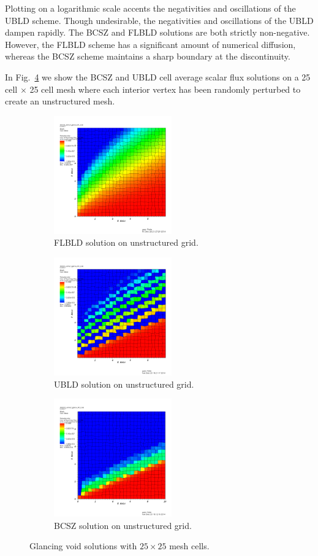 \documentclass{mc2015}
\newcommand{\fig}[1]{Fig.~\ref{#1}}                      %
\begin{document}
Plotting on a logarithmic scale accents the negativities and oscillations of the UBLD scheme.
Though undesirable, the negativities and oscillations of the UBLD dampen rapidly.  
The BCSZ and FLBLD solutions are both strictly non-negative.  
However, the FLBLD scheme has a significant amount of numerical diffusion, whereas the BCSZ scheme maintains a sharp boundary at the discontinuity.

In \fig{fig:unstructured} we show the BCSZ and UBLD cell average scalar flux solutions on a 25 cell $\times$ 25 cell mesh where each interior vertex has been randomly perturbed to create an unstructured mesh.
\begin{figure}[h]
	\begin{center}
	\begin{subfigure}{0.3\textwidth}
		\includegraphics[width=2in]{scb_unstruct.png}
		\caption{FLBLD solution on unstructured grid.}		
		\label{fig:unstructured_scb}
	\end{subfigure}
	\begin{subfigure}{0.3\textwidth}
		\includegraphics[width=2in]{bild_unstruct.png}
		\caption{UBLD solution on unstructured grid.}		
		\label{fig:unstructured_bild}
	\end{subfigure}
	\begin{subfigure}{0.3\textwidth}
		\includegraphics[width=2in]{bcsz_unstruct.png}
		\caption{BCSZ solution on unstructured grid.}
		\label{fig:unstructured_bcsz}
	\end{subfigure}		
	\caption{Glancing void solutions with $25\times 25$ mesh cells.}
	\label{fig:unstructured}
	\end{center}	
\end{figure}
\end{document}
